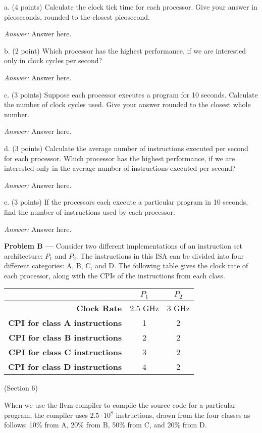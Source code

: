 \documentclass[11pt]{article}
\newcommand{\problem}[1]{\textbf{Problem #1 ---} }
\newcommand{\answer}{{\color{red}\textit{Answer: }}}
\begin{document}
a. (4 points) Calculate the clock tick time for each processor.  Give your answer in picoseconds, rounded to the closest picosecond.

\answer
Answer here.

b. (2 point) Which processor has the highest performance, if we are interested only in clock cycles per second?

\answer
Answer here.

c. (3 points) Suppose each processor executes a program for 10 seconds.  Calculate the number of clock cycles used. Give your answer rounded to the closest whole number.

\answer
Answer here.

d. (3 points) Calculate the average number of instructions executed per second for each processor.  Which processor has the highest performance, if we are interested only in the average number of instructions executed per second?

\answer
Answer here.

e. (3 points) If the processors each execute a particular program in 10 seconds, find the number of instructions used by each processor.

\answer
Answer here.

\problem{B} Consider two different implementations of an instruction set architecture: $P_{1}$ and $P_{2}$.  The instructions in this ISA can be divided into four different categories:  A, B, C, and D.  The following table gives the clock rate of each processor, along with the CPIs of the instructions from each class.

\begin{center}
\begin{tabular}{r||c|c}
& $P_{1}$ & $P_{2}$ \\ \hline
\textbf{Clock Rate} & 2.5 GHz & 3 GHz \\ \hline
\textbf{CPI for class A instructions} & 1 & 2 \\ \hline
\textbf{CPI for class B instructions} & 2 & 2 \\ \hline
\textbf{CPI for class C instructions} & 3 & 2 \\ \hline
\textbf{CPI for class D instructions} & 4 & 2 \\
\end{tabular}
\end{center}
(Section 6)

When we use the llvm compiler to compile the source code for a particular program, the compiler uses $2.5 \cdot 10^{8}$ instructions, drawn from the four classes as follows:  10\% from A, 20\% from B, 50\% from C, and 20\% from D.
\end{document}
